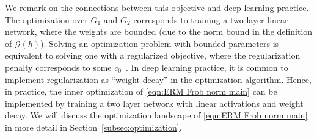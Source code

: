\documentclass[11pt]{article}
\renewcommand{\cite}{\citep}
\newcommand{\Gcal}{\mathcal{G}}
\newcommand{\<}{\langle}
\renewcommand{\>}{\rangle}
\numberwithin{equation}{section}
\begin{document}
We remark on the connections between this objective and deep learning practice. 
The optimization over $G_1$ and $G_2$ corresponds to training a two layer linear network,
where the weights are bounded (due to the norm bound in the definition of $\Gcal(h)$).
Solving an optimization problem with
bounded parameters is equivalent to solving one with a regularized objective, where the regularization penalty corresponds to some $c_0$~\cite{hastie2009elements}. 
In deep learning practice, it is common to implement regularization as ``weight decay'' in the optimization algorithm.
Hence, in practice, the inner optimization of \eqref{eqn:ERM Frob norm main} can be implemented by training a two layer network with linear activations and weight decay. We will discuss the optimization landscape of \eqref{eqn:ERM Frob norm main} in more detail in Section~\ref{subsec:optimization}.



%
\end{document}
